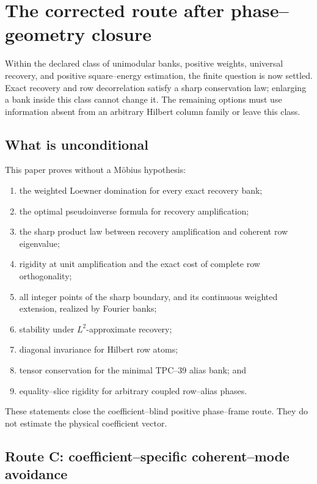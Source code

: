 \section{The corrected route after phase--geometry closure}
\label{sec:tpc40-next-gate}

Within the declared class of unimodular banks, positive weights, universal
recovery, and positive square--energy estimation, the finite question is
now settled.  Exact recovery and row decorrelation satisfy a sharp
conservation law; enlarging a bank inside this class cannot change it.  The
remaining options must use information absent from an arbitrary Hilbert
column family or leave this class.

\subsection{What is unconditional}

This paper proves without a M\"obius hypothesis:
\begin{enumerate}[label=(\roman*)]
 \item the weighted Loewner domination for every exact recovery bank;
 \item the optimal pseudoinverse formula for recovery amplification;
 \item the sharp product law between recovery amplification and coherent
 row eigenvalue;
 \item rigidity at unit amplification and the exact cost of complete row
 orthogonality;
 \item all integer points of the sharp boundary, and its continuous
 weighted extension, realized by Fourier banks;
 \item stability under \(L^2\)-approximate recovery;
 \item diagonal invariance for Hilbert row atoms;
 \item tensor conservation for the minimal TPC--39 alias bank; and
 \item equality--slice rigidity for arbitrary coupled row--alias phases.
\end{enumerate}

These statements close the coefficient--blind positive phase--frame route.
They do not estimate the physical coefficient vector.

\subsection{Route C: coefficient--specific coherent--mode avoidance}

